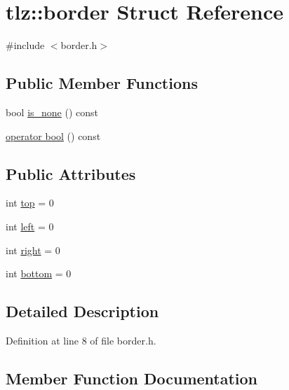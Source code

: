 \hypertarget{structtlz_1_1border}{}\section{tlz\+:\+:border Struct Reference}
\label{structtlz_1_1border}


{\ttfamily \#include $<$border.\+h$>$}

\subsection*{Public Member Functions}
\begin{DoxyCompactItemize}
\item 
bool \hyperlink{structtlz_1_1border_a6187b6ab499b6dc802e99244f7506def}{is\+\_\+none} () const 
\item 
\hyperlink{structtlz_1_1border_afd281e7aaae980caf351d65b64441f35}{operator bool} () const 
\end{DoxyCompactItemize}
\subsection*{Public Attributes}
\begin{DoxyCompactItemize}
\item 
int \hyperlink{structtlz_1_1border_aa6ca12a38179255b45cfedd33fae3ad2}{top} = 0
\item 
int \hyperlink{structtlz_1_1border_a5734cf1a283c5516df752a316dd19de4}{left} = 0
\item 
int \hyperlink{structtlz_1_1border_ab5c0eb6a2c7b29c0da551d320511a7f1}{right} = 0
\item 
int \hyperlink{structtlz_1_1border_a2390d7cf793b1d59d15ce870d76c85c7}{bottom} = 0
\end{DoxyCompactItemize}


\subsection{Detailed Description}


Definition at line 8 of file border.\+h.



\subsection{Member Function Documentation}
